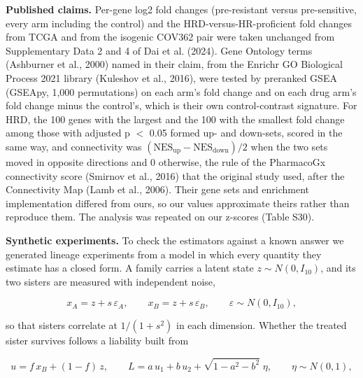\documentclass[11pt,a4paper]{article}
\begin{document}
\textbf{Published claims.} Per-gene log2 fold changes (pre-resistant versus pre-sensitive, every arm including the control) and the HRD-versus-HR-proficient fold changes from TCGA and from the isogenic COV362 pair were taken unchanged from Supplementary Data 2 and 4 of Dai et al. (2024). Gene Ontology terms (Ashburner et al., 2000) named in their claim, from the Enrichr GO Biological Process 2021 library (Kuleshov et al., 2016), were tested by preranked GSEA (GSEApy, 1,000 permutations) on each arm's fold change and on each drug arm's fold change minus the control's, which is their own control-contrast signature. For HRD, the 100 genes with the largest and the 100 with the smallest fold change among those with adjusted p $<$ 0.05 formed up- and down-sets, scored in the same way, and connectivity was $(\mathrm{NES}_{\text{up}} - \mathrm{NES}_{\text{down}})/2$ when the two sets moved in opposite directions and 0 otherwise, the rule of the PharmacoGx connectivity score (Smirnov et al., 2016) that the original study used, after the Connectivity Map (Lamb et al., 2006). Their gene sets and enrichment implementation differed from ours, so our values approximate theirs rather than reproduce them. The analysis was repeated on our z-scores (Table S30).

\textbf{Synthetic experiments.} To check the estimators against a known answer we generated lineage experiments from a model in which every quantity they estimate has a closed form. A family carries a latent state $z \sim N(0, I_{10})$, and its two sisters are measured with independent noise,

\begin{equation}
x_A = z + s\,\varepsilon_A, \qquad x_B = z + s\,\varepsilon_B,
\qquad \varepsilon \sim N(0, I_{10}),
\end{equation}

so that sisters correlate at $1/(1+s^2)$ in each dimension. Whether the treated sister survives follows a liability built from

\begin{equation}
u = f\,x_B + (1-f)\,z, \qquad
L = a\,u_1 + b\,u_2 + \sqrt{1 - a^2 - b^2}\;\eta, \qquad \eta \sim N(0,1),
\end{equation}
\end{document}
